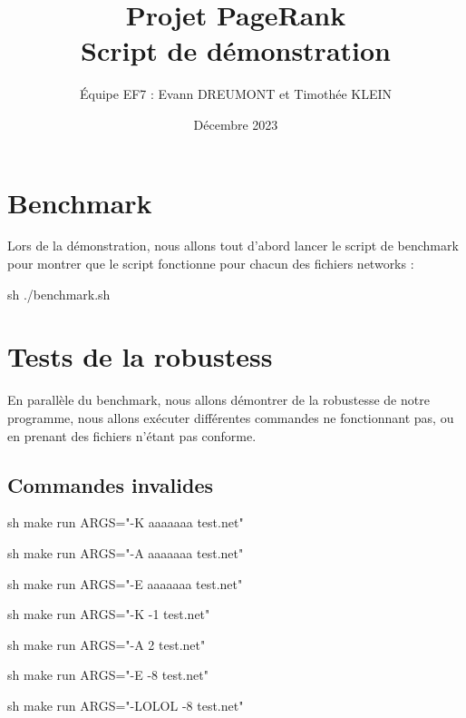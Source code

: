 \documentclass{NewTeX}
\title{Projet PageRank \\ Script de démonstration}
\author{\'Equipe  EF7 : Evann DREUMONT  et  Timothée KLEIN}
\date{Décembre 2023}
\begin{document}
\maketitle

\section{Benchmark}

Lors de la démonstration, nous allons tout d'abord lancer le script de benchmark pour montrer que le script fonctionne pour chacun des fichiers networks :  

\begin{code}{sh}
./benchmark.sh
\end{code}

\section{Tests de la robustess}

En parallèle du benchmark, nous allons démontrer de la robustesse de notre programme, nous allons exécuter différentes commandes ne fonctionnant pas, ou en prenant des fichiers n'étant pas conforme.

\subsection{Commandes invalides}

\begin{code}{sh}
make run ARGS="-K aaaaaaa test.net"
\end{code}

\begin{code}{sh}
make run ARGS="-A aaaaaaa test.net"
\end{code}

\begin{code}{sh}
make run ARGS="-E aaaaaaa test.net"
\end{code}

\begin{code}{sh}
make run ARGS="-K -1 test.net"
\end{code}

\begin{code}{sh}
make run ARGS="-A 2 test.net"
\end{code}

\begin{code}{sh}
make run ARGS="-E -8 test.net"
\end{code}

\begin{code}{sh}
make run ARGS="-LOLOL -8 test.net"
\end{code}
\end{document}
